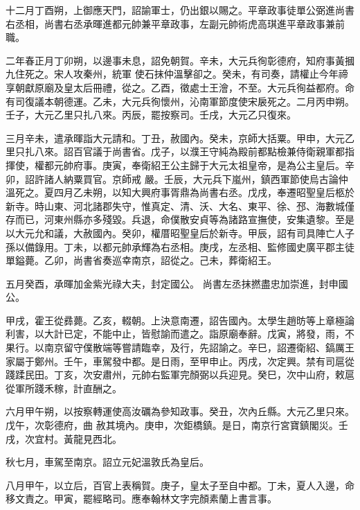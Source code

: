 \begin{pinyinscope}
 十二月丁酉朔，上御應天門，詔諭軍士，仍出銀以賜之。平章政事徒單公弼進尚書右丞相，尚書右丞承暉進都元帥兼平章政事，左副元帥術虎高琪進平章政事兼前職。



 二年春正月丁卯朔，以邊事未息，詔免朝賀。辛未，大元兵徇彰德府，知府事黃摑九住死之。宋人攻秦州，統軍
 使石抹仲溫擊卻之。癸未，有司奏，請權止今年禘享朝獻原廟及皇太后冊禮，從之。乙酉，徵處士王澮，不至。大元兵徇益都府。命有司復議本朝德運。乙未，大元兵徇懷州，沁南軍節度使宋扆死之。二月丙申朔。壬子，大元乙里只扎八來。丙辰，罷按察司。壬戌，大元乙只復來。



 三月辛未，遣承暉詣大元請和。丁丑，赦國內。癸未，京師大括粟。甲申，大元乙里只扎八來。詔百官議于尚書省。戊子，以濮王守純為殿前都點檢兼侍衛親軍都指揮使，權都元帥府事。庚寅，奉衛紹王公主歸于大元太祖皇帝，是為公主皇后。辛卯，詔許諸人納粟買官。京師戒
 嚴。壬辰，大元兵下嵐州，鎮西軍節使烏古論仲溫死之。夏四月乙未朔，以知大興府事胥鼎為尚書右丞。戊戌，奉遷昭聖皇后柩於新寺。時山東、河北諸郡失守，惟真定、清、沃、大名、東平、徐、邳、海數城僅存而已，河東州縣亦多殘毀。兵退，命僕散安貞等為諸路宣撫使，安集遺黎。至是以大元允和議，大赦國內。癸卯，權厝昭聖皇后於新寺。甲辰，詔有司具陣亡人子孫以備錄用。丁未，以都元帥承輝為右丞相。庚戌，左丞相、監修國史廣平郡主徒單鎰薨。乙卯，尚書省奏巡幸南京，詔從之。己未，葬衛紹王。



 五月癸酉，承暉加金紫光祿大夫，封定國公。
 尚書左丞抹撚盡忠加崇進，封申國公。



 甲戌，霍王從彞薨。乙亥，輟朝。上決意南遷，詔告國內。太學生趙昉等上章極論利害，以大計已定，不能中止，皆慰諭而遣之。詣原廟奉辭。戊寅，將發，雨，不果行。以南京留守僕散端等嘗請臨幸，及行，先詔諭之。辛巳，詔遷衛紹、鎬厲王家屬于鄭州。壬午，車駕發中都。是日雨，至甲申止。丙戌，次定興。禁有司扈從踐蹂民田。丁亥，次安肅州，元帥右監軍完顏弼以兵迎見。癸巳，次中山府，敕扈從軍所踐禾稼，計直酬之。



 六月甲午朔，以按察轉運使高汝礪為參知政事。癸丑，次內丘縣。大元乙里只來。戊午，次彰德府，曲
 赦其境內。庚申，次鉅橋鎮。是日，南京行宮寶鎮閣災。壬戌，次宜村。黃龍見西北。



 秋七月，車駕至南京。詔立元妃溫敦氏為皇后。



 八月甲午，以立后，百官上表稱賀。庚子，皇太子至自中都。丁未，夏人入邊，命移文責之。甲寅，罷經略司。應奉翰林文字完顏素蘭上書言事。




\end{pinyinscope}
